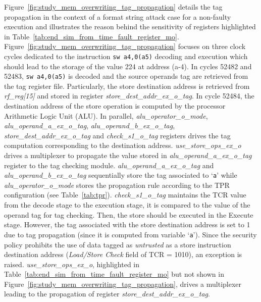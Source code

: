 Figure~\ref{fig:study_mem_overwriting_tag_propagation} details the tag propagation in the context of a format string attack case for a non-faulty execution and illustrates the reason behind the sensitivity of registers highlighted in Table~\ref{tab:end_sim_from_time_fault_register_mo}.
Figure~\ref{fig:study_mem_overwriting_tag_propagation} focuses on three clock cycles dedicated to the instruction \verb|sw a4,0(a5)| decoding and execution which should lead to the storage of the value 224 at address (a-4). 
In cycles 52482 and 52483, \verb|sw a4,0(a5)| is decoded and the source operands tag are retrieved from the tag register file. Particularly, the store destination address is retrieved from \textit{rf\_reg[15]} and stored in register \textit{store\_dest\_addr\_ex\_o\_tag}. In cycle 52484, the destination address of the store operation is computed by the processor Arithmetic Logic Unit (ALU).
In parallel, \textit{alu\_operator\_o\_mode}, \textit{alu\_operand\_a\_ex\_o\_tag}, \textit{alu\_operand\_b\_ex\_o\_tag}, \textit{store\_dest\_addr\_ex\_o\_tag} and \textit{check\_s1\_o\_tag} registers drives the tag computation corresponding to the destination address. 
\textit{use\_store\_ops\_ex\_o} drives a multiplexer to propagate the value stored in \textit{alu\_operand\_a\_ex\_o\_tag} register to the tag checking module. 
\textit{alu\_operand\_a\_ex\_o\_tag} and \textit{alu\_operand\_b\_ex\_o\_tag} sequentially store the tag associated to `\verb|a|' while \textit{alu\_operator\_o\_mode} stores the propagation rule according to the TPR configuration (see Table~\ref{tab:tpr}).
\textit{check\_s1\_o\_tag} maintains the TCR value from the decode stage to the execution stage, it is compared to the value of the operand tag for tag checking.
Then, the store should be executed in the Execute stage. However, the tag associated with the store destination address is set to 1 due to tag propagation (since it is computed from variable `\verb|a|'). 
Since the security policy prohibits the use of data tagged as \textit{untrusted} as a store instruction destination address (\textit{Load/Store Check} field of TCR = 1010), an exception is raised.
\textit{use\_store\_ops\_ex\_o}, highlighted in Table~\ref{tab:end_sim_from_time_fault_register_mo} but not shown in Figure~\ref{fig:study_mem_overwriting_tag_propagation}, drives a multiplexer leading to the propagation of register \textit{store\_dest\_addr\_ex\_o\_tag}.

